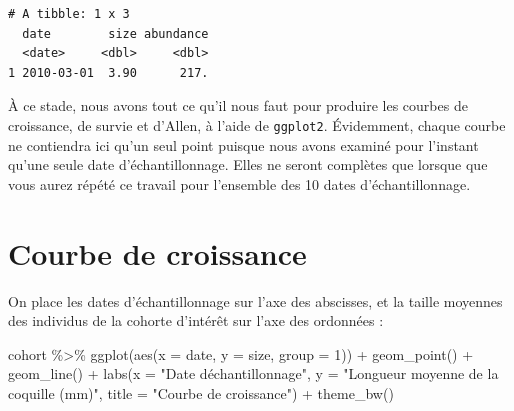 \documentclass[
  a4paper,
  DIV=11,
  numbers=noendperiod,
  oneside]{scrreprt}
\newenvironment{Shaded}{}{}
\newcommand{\AttributeTok}[1]{\textcolor[rgb]{0.84,0.23,0.29}{#1}}
\newcommand{\DecValTok}[1]{\textcolor[rgb]{0.00,0.36,0.77}{#1}}
\newcommand{\FunctionTok}[1]{\textcolor[rgb]{0.44,0.26,0.76}{#1}}
\newcommand{\NormalTok}[1]{\textcolor[rgb]{0.14,0.16,0.18}{#1}}
\newcommand{\SpecialCharTok}[1]{\textcolor[rgb]{0.00,0.36,0.77}{#1}}
\newcommand{\StringTok}[1]{\textcolor[rgb]{0.01,0.18,0.38}{#1}}
\begin{document}
\begin{verbatim}
# A tibble: 1 x 3
  date        size abundance
  <date>     <dbl>     <dbl>
1 2010-03-01  3.90      217.
\end{verbatim}

À ce stade, nous avons tout ce qu'il nous faut pour produire les courbes
de croissance, de survie et d'Allen, à l'aide de \texttt{ggplot2}.
Évidemment, chaque courbe ne contiendra ici qu'un seul point puisque
nous avons examiné pour l'instant qu'une seule date d'échantillonnage.
Elles ne seront complètes que lorsque que vous aurez répété ce travail
pour l'ensemble des 10 dates d'échantillonnage.

\hypertarget{courbe-de-croissance}{%
\section{Courbe de croissance}\label{courbe-de-croissance}}

On place les dates d'échantillonnage sur l'axe des abscisses, et la
taille moyennes des individus de la cohorte d'intérêt sur l'axe des
ordonnées :

\begin{Shaded}
\begin{Highlighting}[]
\NormalTok{cohort }\SpecialCharTok{\%\textgreater{}\%}
  \FunctionTok{ggplot}\NormalTok{(}\FunctionTok{aes}\NormalTok{(}\AttributeTok{x =}\NormalTok{ date, }\AttributeTok{y =}\NormalTok{ size, }\AttributeTok{group =} \DecValTok{1}\NormalTok{)) }\SpecialCharTok{+}
  \FunctionTok{geom\_point}\NormalTok{() }\SpecialCharTok{+}
  \FunctionTok{geom\_line}\NormalTok{() }\SpecialCharTok{+}
  \FunctionTok{labs}\NormalTok{(}\AttributeTok{x =} \StringTok{"Date d\textquotesingle{}échantillonnage"}\NormalTok{,}
       \AttributeTok{y =} \StringTok{"Longueur moyenne de la coquille (mm)"}\NormalTok{,}
       \AttributeTok{title =} \StringTok{"Courbe de croissance"}\NormalTok{) }\SpecialCharTok{+}
  \FunctionTok{theme\_bw}\NormalTok{()}
\end{Highlighting}
\end{Shaded}

\end{document}
